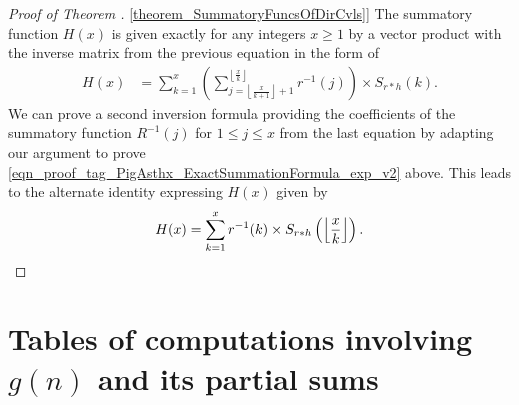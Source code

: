 \documentclass[11pt,reqno,a4letter]{article}
\newcommand{\hlocalref}[1]{\hyperref[#1]{\ref{#1}}}
\numberwithin{equation}{section}
\numberwithin{figure}{section}
\numberwithin{table}{section}
\newcommand{\floor}[1]{\left\lfloor #1 \right\rfloor}
\newcommand{\Floor}[2]{\ensuremath{\left\lfloor \frac{#1}{#2} \right\rfloor}}
\theoremstyle{plain}
\numberwithin{theorem}{section}
\theoremstyle{definition}
\renewcommand{\arraystretch}{1.25}
\begin{document}
\begin{proof}[Proof of Theorem \hlocalref{theorem_SummatoryFuncsOfDirCvls}]
The summatory function $H(x)$ is given exactly for any integers $x \geq 1$ 
by a vector product with the inverse matrix from the previous equation in the form of 
\begin{align*} 
H(x) & = \sum_{k=1}^x \left(\sum_{j=\floor{\frac{x}{k+1}}+1}^{\floor{\frac{x}{k}}} r^{-1}(j)\right) 
     \times S_{r \ast h}(k). 
\end{align*} 
We can prove a second inversion formula providing the coefficients of the summatory function 
$R^{-1}(j)$ for $1 \leq j \leq x$ from the last equation by adapting our argument to prove 
\eqref{eqn_proof_tag_PigAsthx_ExactSummationFormula_exp_v2} above. 
This leads to the alternate identity expressing $H(x)$ given by 
\[
H(x) = \sum_{k=1}^{x} r^{-1}(k) \times S_{r \ast h}\left(\Floor{x}{k}\right). 
     \qedhere 
\]
\end{proof} 

\clearpage 

\newpage
\section{Tables of computations involving $g(n)$ and its partial sums} 
\label{table_conjecture_Mertens_ginvSeq_approx_values}

\renewcommand{\arraystretch}{1.25}
\end{document}

